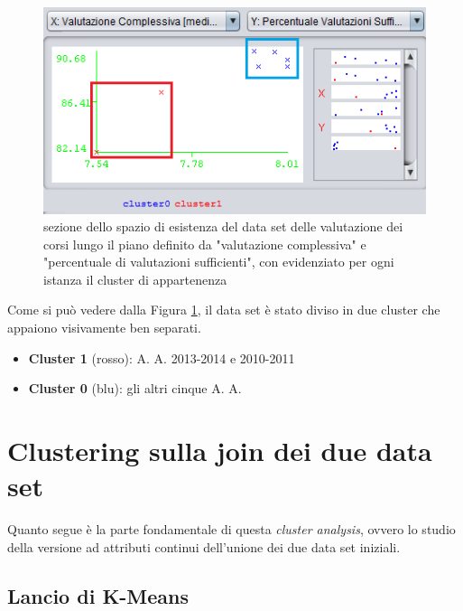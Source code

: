         

        \begin{figure}
            \centering
            \caption{sezione dello spazio di esistenza del data set delle valutazione dei corsi lungo il piano definito da "valutazione complessiva" e "percentuale di valutazioni sufficienti", con evidenziato per ogni istanza il cluster di appartenenza}
            \label{eval_kmeans}
            \includegraphics[scale=1.2]{../cluster/eval_kmeans.png}
        \end{figure}

        Come si può vedere dalla Figura \ref{eval_kmeans}, il data set è stato diviso in due cluster che appaiono visivamente ben separati.

        \begin{itemize}
            \item \textbf{Cluster 1} (rosso): A. A. 2013-2014 e 2010-2011
            \item \textbf{Cluster 0} (blu): gli altri cinque A. A.
        \end{itemize}

\section{Clustering sulla join dei due data set}

    Quanto segue è la parte fondamentale di questa \textit{cluster analysis}, ovvero lo studio della versione ad attributi continui dell'unione dei due data set iniziali.

    \subsection{Lancio di K-Means}

